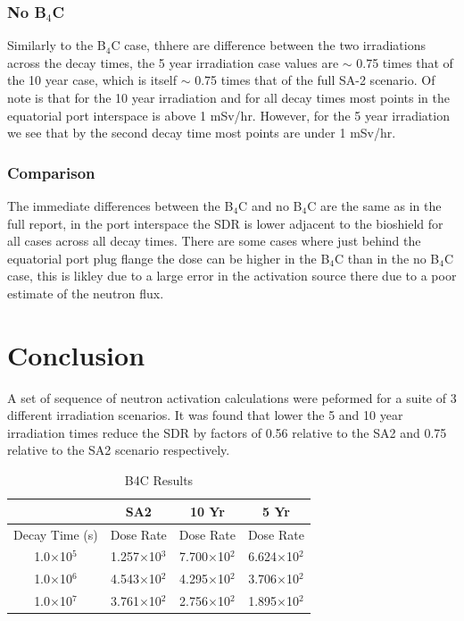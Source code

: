 \documentclass[12pt]{article}
\begin{document}
\subsubsection*{No B$_4$C}
Similarly to the B$_4$C case, thhere are difference between the two irradiations
across the decay times, the 5 year irradiation case values are $\sim$ 0.75 times
 that of the 10 year case, which is itself $\sim$ 0.75 times that of the full 
SA-2 scenario. Of note is that for the 10 year irradiation and for all decay 
times most points in the equatorial port interspace is above 1 mSv/hr. However,
for the 5 year irradiation we see that by the second decay time most points 
are under 1 mSv/hr. 
\subsubsection*{Comparison}
The immediate differences between the B$_4$C and no B$_4$C are the same as in 
the full report, in the port interspace the SDR is lower adjacent to the 
bioshield for all cases across all decay times. There are some cases where
just behind the equatorial port plug flange the dose can be higher in the 
B$_4$C than in the no B$_4$C case, this is likley due to a large error in the 
activation source there due to a poor estimate of the neutron flux. 
\clearpage
\newpage
\section{Conclusion}
A set of sequence of neutron activation calculations were peformed for a suite 
of 3 different irradiation scenarios. It was found that lower the 5 and 10 year
irradiation times reduce the SDR by factors of 0.56 relative to the SA2 and
0.75 relative to the SA2 scenario respectively.

\begin{table}[ht!]
   \centering      
   \begin{tabular}{| c | c | c | c |}
      \hline
      & SA2 & 10 Yr & 5 Yr \\
      \hline
      Decay Time (s) & Dose Rate & Dose Rate & Dose Rate \\
      \hline
      1.0$\times$10$^{5}$ & 1.257$\times$10$^{3}$ & 7.700$\times$10$^{2}$ & 6.624$\times$10$^{2}$ \\
      1.0$\times$10$^{6}$ & 4.543$\times$10$^{2}$ & 4.295$\times$10$^{2}$ & 3.706$\times$10$^{2}$ \\
      1.0$\times$10$^{7}$ & 3.761$\times$10$^{2}$ & 2.756$\times$10$^{2}$ & 1.895$\times$10$^{2}$ \\
      \hline
\end{tabular}
\caption{B4C Results}
\label{tab:b4c_summary_scenario}
\end{table}
\end{document}
